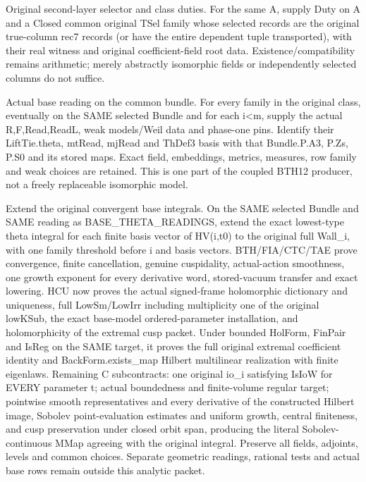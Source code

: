 \begin{description}[style=nextline]
\item[30. SECOND\_LAYER\_COMPATIBLE\_SELECTION --- C] Original second-layer selector and class duties. For the same A, supply Duty on A and a Closed common original TSel family whose selected records are the original true-column rec7 records (or have the entire dependent tuple transported), with their real witness and original coefficient-field root data. Existence/compatibility remains arithmetic; merely abstractly isomorphic fields or independently selected columns do not suffice.

\item[31. BASE\_THETA\_READINGS --- C] Actual base reading on the common bundle. For every family in the original class, eventually on the SAME selected Bundle and for each i<m, supply the actual R,F,Read,ReadL, weak models/Weil data and phase-one pins. Identify their LiftTie.theta, mtRead, mjRead and ThDef3 basis with that Bundle.P.A3, P.Zs, P.S0 and its stored maps. Exact field, embeddings, metrics, measures, row family and weak choices are retained. This is one part of the coupled BTH12 producer, not a freely replaceable isomorphic model.

\item[32. BASE\_THETA\_CUSPIDAL\_EXTENSION --- C] Extend the original convergent base integrals. On the SAME selected Bundle and SAME reading as BASE\_THETA\_READINGS, extend the exact lowest-type theta integral for each finite basis vector of HV(i,t0) to the original full Wall\_i, with one family threshold before i and basis vectors. BTH/FIA/CTC/TAE prove convergence, finite cancellation, genuine cuspidality, actual-action smoothness, one growth exponent for every derivative word, stored-vacuum transfer and exact lowering. HCU now proves the actual signed-frame holomorphic dictionary and uniqueness, full LowSm/LowIrr including multiplicity one of the original lowKSub, the exact base-model ordered-parameter installation, and holomorphicity of the extremal cusp packet. Under bounded HolForm, FinPair and IsReg on the SAME target, it proves the full original extremal coefficient identity and BackForm.exists\_map Hilbert multilinear realization with finite eigenlaws. Remaining C subcontracts: one original io\_i satisfying IsIoW for EVERY parameter t; actual boundedness and finite-volume regular target; pointwise smooth representatives and every derivative of the constructed Hilbert image, Sobolev point-evaluation estimates and uniform growth, central finiteness, and cusp preservation under closed orbit span, producing the literal Sobolev-continuous MMap agreeing with the original integral. Preserve all fields, adjoints, levels and common choices. Separate geometric readings, rational tests and actual base rows remain outside this analytic packet.


\end{description}
